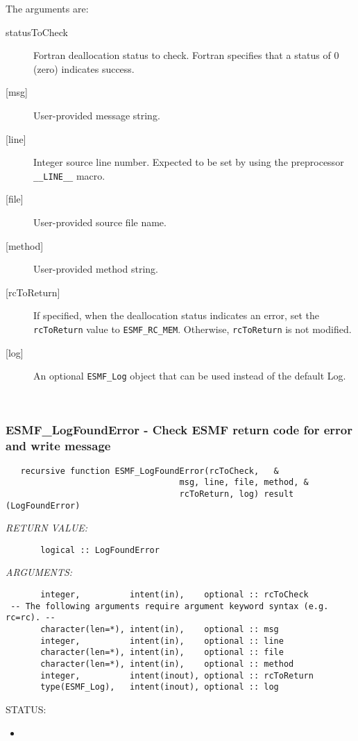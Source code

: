         The arguments are:
        \begin{description}
  
        \item [statusToCheck]
              Fortran deallocation status to check.  Fortran specifies
              that a status of 0 (zero) indicates success.
        \item [{[msg]}]
              User-provided message string.
        \item [{[line]}]
              Integer source line number.  Expected to be set by
              using the preprocessor {\tt \_\_LINE\_\_} macro.
        \item [{[file]}]
              User-provided source file name.
        \item [{[method]}]
              User-provided method string.
        \item [{[rcToReturn]}]
              If specified, when the deallocation status indicates an error,
              set the {\tt rcToReturn} value to {\tt ESMF\_RC\_MEM}.  Otherwise,
              {\tt rcToReturn} is not modified.
        \item [{[log]}]
              An optional {\tt ESMF\_Log} object that can be used instead
              of the default Log.
  
        \end{description}
   
 
\mbox{}\hrulefill\ 
 
\subsubsection [ESMF\_LogFoundError] {ESMF\_LogFoundError - Check ESMF return code for error and write message}


 
\begin{verbatim}   recursive function ESMF_LogFoundError(rcToCheck,   &
                                   msg, line, file, method, &
                                   rcToReturn, log) result (LogFoundError)\end{verbatim}{\em RETURN VALUE:}
\begin{verbatim}       logical :: LogFoundError\end{verbatim}{\em ARGUMENTS:}
\begin{verbatim}       integer,          intent(in),    optional :: rcToCheck
 -- The following arguments require argument keyword syntax (e.g. rc=rc). --
       character(len=*), intent(in),    optional :: msg
       integer,          intent(in),    optional :: line
       character(len=*), intent(in),    optional :: file
       character(len=*), intent(in),    optional :: method
       integer,          intent(inout), optional :: rcToReturn
       type(ESMF_Log),   intent(inout), optional :: log
 \end{verbatim}
{\sf STATUS:}
   \begin{itemize}
   \item{}
   \end{itemize}
  
